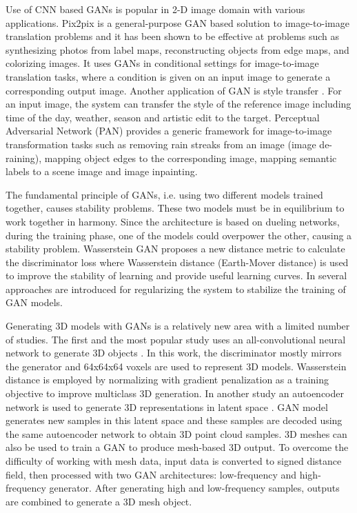 \documentclass[runningheads]{llncs}
\begin{document}
Use of CNN based GANs \cite{radford2015unsupervised} is popular in 2-D image domain with various applications.  Pix2pix \cite{isola2017image} is a general-purpose GAN based solution to image-to-image translation problems and it has been shown to be effective at problems such as synthesizing photos from label maps, reconstructing objects from edge maps, and colorizing images. It uses GANs in conditional settings for image-to-image translation tasks, where a condition is given on an input image to generate a corresponding output image. Another application of GAN is style transfer \cite{luan2017deep}. For an input image, the system can transfer the style of the reference image including time of the day, weather, season and artistic edit to the target. Perceptual Adversarial Network (PAN) \cite{wang2018perceptual} provides a generic framework for image-to-image transformation tasks such as removing rain streaks from an image (image de-raining), mapping object edges to the corresponding image, mapping semantic labels to a scene image and image inpainting.

The fundamental principle of GANs, i.e. using two different models trained together, causes stability problems. These two models must be in equilibrium to work together in harmony. Since the architecture is based on dueling networks, during the training phase, one of the models could overpower the other, causing a stability problem. Wasserstein GAN \cite{arjovsky2017wasserstein} proposes a new distance metric to calculate the discriminator loss where Wasserstein distance (Earth-Mover distance) is used to improve the stability of learning and provide useful learning curves. In \cite{che2016mode} several approaches are introduced for regularizing the system to stabilize the training of GAN models.

Generating 3D models with GANs is a relatively new area with a limited number of studies. The first and the most popular study uses an all-convolutional neural network to generate 3D objects \cite{wu2016learning}. In this work, the discriminator mostly mirrors the generator and 64x64x64 voxels are used to represent 3D models. Wasserstein distance \cite{smith2017improved} is employed by normalizing with gradient penalization as a training objective to improve multiclass 3D generation. In another study an autoencoder network is used to generate 3D representations in latent space \cite{achlioptas2017representation}. GAN model generates new samples in this latent space and these samples are decoded using the same autoencoder network to obtain 3D point cloud samples. 3D meshes can also be used to train a GAN \cite{jiang2017hierarchical} to produce mesh-based 3D output. To overcome the difficulty of working with mesh data, input data is converted to signed distance field, then processed with two GAN architectures: low-frequency and high-frequency generator. After generating high and low-frequency samples, outputs are combined to generate a 3D mesh object.
\end{document}

